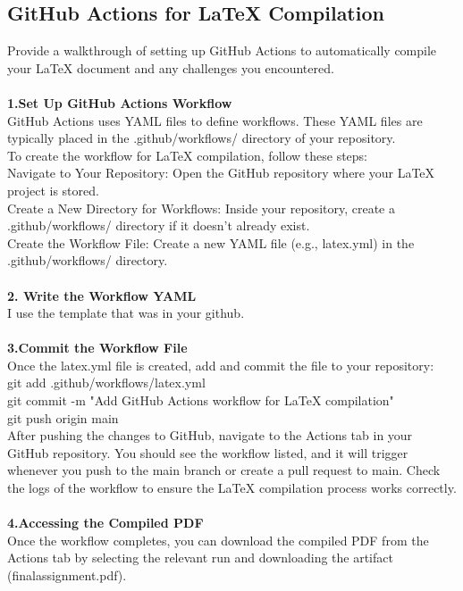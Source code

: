 \documentclass[a4paper,12pt]{article}
\begin{document}
\subsection{GitHub Actions for LaTeX Compilation}
Provide a walkthrough of setting up GitHub Actions to automatically compile your LaTeX document and any challenges you encountered.
\\
\\\textbf{1.Set Up GitHub Actions Workflow}
\\GitHub Actions uses YAML files to define workflows. These YAML files are typically placed in the .github/workflows/ directory of your repository.
\\To create the workflow for LaTeX compilation, follow these steps:
\\Navigate to Your Repository: Open the GitHub repository where your LaTeX project is stored.
\\Create a New Directory for Workflows: Inside your repository, create a .github/workflows/ directory if it doesn’t already exist.
\\Create the Workflow File: Create a new YAML file (e.g., latex.yml) in the .github/workflows/ directory.
\\
\\\textbf{2. Write the Workflow YAML}
\\I use the template that was in your github.
\\
\\\textbf{3.Commit the Workflow File}
\\Once the latex.yml file is created, add and commit the file to your repository:  
\\git add .github/workflows/latex.yml
\\git commit -m "Add GitHub Actions workflow for LaTeX compilation"
\\git push origin main
\\After pushing the changes to GitHub, navigate to the Actions tab in your GitHub repository.
You should see the workflow listed, and it will trigger whenever you push to the main branch or create a pull request to main.
Check the logs of the workflow to ensure the LaTeX compilation process works correctly.
\\
\\\textbf{4.Accessing the Compiled PDF}
\\Once the workflow completes, you can download the compiled PDF from the Actions tab by selecting the relevant run and downloading the artifact (finalassignment.pdf).
\end{document}

